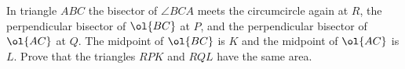 In triangle $ABC$ the bisector of $\angle BCA$
meets the circumcircle again at $R$,
the perpendicular bisector of $\ol{BC}$ at $P$,
and the perpendicular bisector of $\ol{AC}$ at $Q$.
The midpoint of $\ol{BC}$ is $K$ and the midpoint of $\ol{AC}$ is $L$.
Prove that the triangles $RPK$ and $RQL$ have the same area.